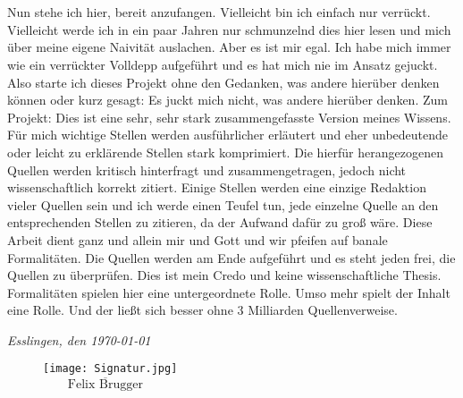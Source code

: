 \\~\\
Nun stehe ich hier, bereit anzufangen. Vielleicht bin ich einfach nur verrückt. Vielleicht werde ich in ein paar Jahren nur schmunzelnd dies hier lesen und mich über meine eigene Naivität auslachen. Aber es ist mir egal. Ich habe mich immer wie ein verrückter Volldepp aufgeführt und es hat mich nie im Ansatz gejuckt.  Also starte ich dieses Projekt ohne den Gedanken, was andere hierüber denken können oder kurz gesagt: Es juckt mich nicht, was andere hierüber denken.
\newpage
Zum Projekt: Dies ist eine sehr, sehr stark zusammengefasste Version meines Wissens. Für mich wichtige Stellen werden ausführlicher erläutert und eher unbedeutende oder leicht zu erklärende Stellen stark komprimiert. Die hierfür herangezogenen Quellen werden kritisch hinterfragt und zusammengetragen, jedoch nicht wissenschaftlich korrekt zitiert. Einige Stellen werden eine einzige Redaktion vieler Quellen sein und ich werde einen Teufel tun, jede einzelne Quelle an den entsprechenden Stellen zu zitieren, da der Aufwand dafür zu groß wäre. Diese Arbeit dient ganz und allein mir und Gott und wir pfeifen auf banale Formalitäten. Die Quellen werden am Ende aufgeführt und es steht jeden frei, die Quellen zu überprüfen. Dies ist mein Credo und keine wissenschaftliche Thesis. Formalitäten spielen hier eine untergeordnete Rolle. Umso mehr spielt der Inhalt eine Rolle. Und der ließt sich besser ohne 3 Milliarden Quellenverweise.
\bigskip
\begin{flushright}
\textit{Esslingen, den \today}
\end{flushright}
\bigskip
\bigskip
\bigskip
\bigskip
\bigskip
\bigskip
\bigskip
\bigskip
\bigskip
\begin{figure}[h]
\begin{flushright}
\texttt{[image: Signatur.jpg]}\\
$\overline{~~~~~~~~~\mbox{Felix Brugger}~~~~~~~~~}$
\end{flushright}
\end{figure}